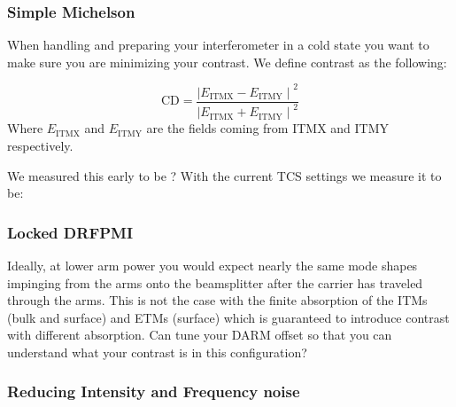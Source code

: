 
\subsubsection{Simple Michelson}
When handling and preparing your interferometer in a cold state you want to make sure you are minimizing your contrast. We define contrast as the following: 

$$ 
\mathrm{CD} = \frac{{\mid E_{\mathrm{ITMX}}-E_{\mathrm{ITMY}}\mid}^2}{{\mid E_{\mathrm{ITMX}}+E_{\mathrm{ITMY}}\mid}^2}
$$ 
Where $E_\mathrm{ITMX}$ and $E_\mathrm{ITMY}$ are the fields coming from ITMX and ITMY respectively. 

We measured this early to be ?
With the current TCS settings we measure it to be: 


\subsubsection{Locked DRFPMI}
Ideally, at lower arm power you would expect nearly the same mode shapes impinging from the arms onto the beamsplitter after the carrier has traveled through the arms. This is not the case with the finite absorption of the ITMs (bulk and surface) and ETMs (surface) which is guaranteed to introduce contrast with different absorption. Can tune your DARM offset so that you can understand what your contrast is in this configuration?

\subsubsection{Reducing Intensity and Frequency noise}

